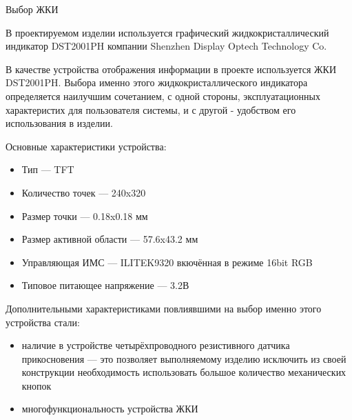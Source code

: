 Выбор ЖКИ

В проектируемом изделии используется графический жидкокристаллический индикатор
DST2001PH компании Shenzhen Display Optech Technology Co.

В качестве устройства отображения информации в проекте используется ЖКИ DST2001PH.
Выбора именно этого жидкокристаллического индикатора определяется наилучшим сочетанием,
с одной стороны, эксплуатационных характеристих для пользователя системы, и с другой - 
удобством его использования в изделии.

Основные характеристики устройства:
\begin{itemize}
	\item{} Тип --- TFT 
	\item{} Количество точек --- 240x320
	\item{} Размер точки --- 0.18x0.18 мм
	\item{} Размер активной области --- 57.6x43.2 мм
	\item{} Управляющая ИМС --- ILITEK9320 вкючённая в режиме 16bit RGB
	\item{} Типовое питающее напряжение --- 3.2В
\end{itemize}

Дополнительными характеристиками повлиявшими на выбор именно этого устройства
стали:
\begin{itemize}
	\item{} наличие в устройстве четырёхпроводного резистивного датчика
		прикосновения ---  это позволяет выполняемому изделию 
		исключить из своей конструкции необходимость использовать
		большое количество механических кнопок
	\item{} многофункциональность устройства ЖКИ
\end{itemize}


